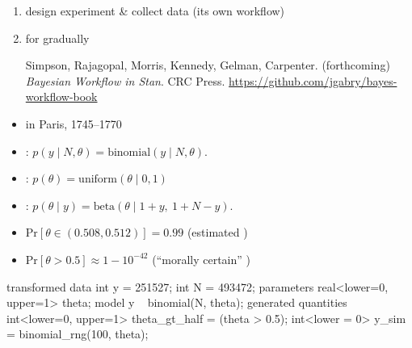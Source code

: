 \documentclass[10pt]{report}
\begin{document}

\begin{enumerate}
\item design experiment \& collect data (its own workflow)
\item for gradually 
\vfill
{\footnotesize Simpson, Rajagopal, Morris, Kennedy, Gelman, Carpenter.  (forthcoming) {\it Bayesian Workflow in Stan}. CRC Press. \url{https://github.com/jgabry/bayes-workflow-book}}
\end{enumerate}


\begin{itemize}
\item {} in Paris, 1745--1770
\item {}:
$p(y \mid N, \theta)
 = \textrm{binomial}(y \mid N, \theta).$
\item {}:
$p(\theta)
 = \textrm{uniform}(\theta \mid 0, 1)$
\item {}:
$p(\theta \mid y)
 = \textrm{beta}(\theta \mid 1 + y, \ 1 + N - y).$
\vfill
\item {$\textrm{Pr}[\theta \in (0.508, 0.512)] = 0.99$}
\hfill {\small (estimated )}
\item {$\textrm{Pr}[\theta > 0.5] \approx 1 - 10^{-42}$}
\hfill {\small (``morally certain'' )}
\end{itemize}

\begin{stancode}
transformed data {
  int y = 251527;  int N = 493472;
}
parameters {
  real<lower=0, upper=1> theta;
}
model {
  y ~ binomial(N, theta);
}
generated quantities {
  int<lower=0, upper=1> theta_gt_half = (theta > 0.5);
  int<lower = 0> y_sim = binomial_rng(100, theta);
}
\end{stancode}
\end{document}

